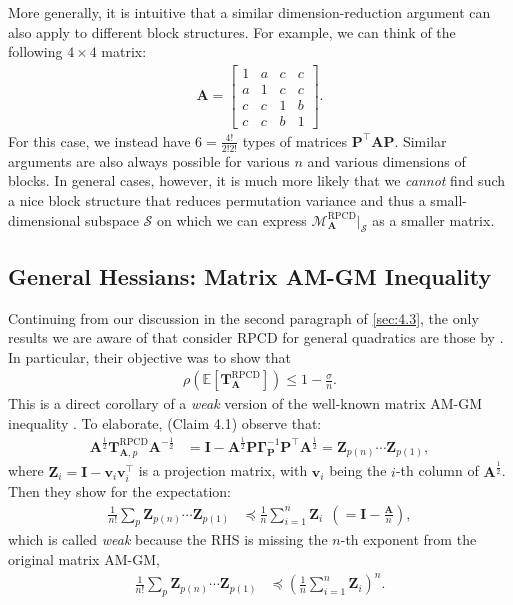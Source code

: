 \documentclass{article}
\theoremstyle{plain}
\theoremstyle{definition}
\theoremstyle{remark}
\def\bigopen#1{\left(#1\right)}
\newcommand{\mGamma}{\bm{\Gamma}}
\newcommand{\RPCD}{\text{RPCD}} %
\newcommand{\MARPCD}{\mathcal{M}_{\bm{A}}^{\RPCD}} %
\def\vv{{\bm{v}}}
\def\mA{{\bm{A}}}
\def\mI{{\bm{I}}}
\def\mP{{\bm{P}}}
\def\mT{{\bm{T}}}
\def\mZ{{\bm{Z}}}
\def\gS{{\mathcal{S}}}
\begin{document}
More generally, it is intuitive that a similar dimension-reduction argument can also apply to different block structures.
For example, we can think of the following $4 \times 4$ matrix:
\begin{align}
    \mA = \begin{bmatrix}
        1 & a & c & c \\
        a & 1 & c & c \\
        c & c & 1 & b \\
        c & c & b & 1
    \end{bmatrix}.
\end{align}
For this case, we instead have $6 = \frac{4!}{2!2!}$ types of matrices $\mP^{\top} \mA \mP$.
Similar arguments are also always possible for various $n$ and various dimensions of blocks.
In general cases, however, it is much more likely that we \emph{cannot} find such a nice block structure that reduces permutation variance and thus a small-dimensional subspace $\gS$ on which we can express $\MARPCD|_{\gS}$ as a smaller matrix.

\subsection{General Hessians: Matrix AM-GM Inequality}
\label{sec:e.2}

Continuing from our discussion in the second paragraph of \cref{sec:4.3}, the only results we are aware of that consider RPCD for general quadratics are those by \citet{sun20}.
In particular, their objective was to show that
\begin{align*}
    \rho (\mathbb{E} [\mT_{\mA}^{\text{RPCD}}]) \le 1 - \frac{\sigma}{n}.
\end{align*}
This is a direct corollary of a \emph{weak} version of the well-known matrix AM-GM inequality \citep{recht12,lai20a,desa20,yun21a}.
To elaborate, \citet{sun20} (Claim 4.1) observe that:
\begin{align}
    \mA^{\frac12} \mT_{\mA, p}^{\text{RPCD}} \mA^{-\frac12} &= \mI - \mA^{\frac12} \mP \mGamma_{\mP}^{-1} \mP^{\top} \mA^{\frac12} = \mZ_{p(n)} \cdots \mZ_{p(1)}, 
    \label{eq:matrixamgm2}
\end{align}
where $\mZ_{i} = \mI - \vv_{i} \vv_{i}^{\top}$ is a projection matrix, with $\vv_{i}$ being the $i$-th column of $\mA^{\frac12}$.
Then they show for the expectation:
\begin{align*}
    \frac{1}{n!} \sum_{p} \mZ_{p(n)} \cdots \mZ_{p(1)} &\preceq \frac{1}{n} \sum_{i=1}^{n} \mZ_{i} \ \ \bigopen{= \mI - \frac{\mA}{n}},
\end{align*}
which is called \emph{weak} because the RHS is missing the $n$-th exponent from the original matrix AM-GM,
\begin{align*}
    \frac{1}{n!} \sum_{p} \mZ_{p(n)} \cdots \mZ_{p(1)} &\preceq \bigopen{\frac{1}{n} \sum_{i=1}^{n} \mZ_{i}}^{n}.
\end{align*}
\end{document}
